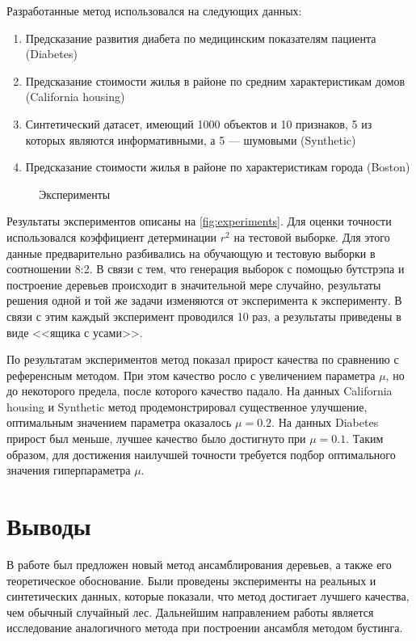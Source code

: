 \documentclass{article}
\begin{document}
Разработанные метод использовался на следующих данных:
\begin{enumerate}
  \item Предсказание развития диабета по медицинским показателям пациента (Diabetes)
  \item Предсказание стоимости жилья в районе по средним характеристикам домов (California housing)
  \item Синтетический датасет, имеющий 1000 объектов и 10 признаков, 5 из которых являются информативными, а 5 --- шумовыми (Synthetic)
  \item Предсказание стоимости жилья в районе по характеристикам города (Boston)
\end{enumerate}

\begin{figure}[h]
  \centering
  
  
  
  
  \caption{Эксперименты}
  \label{fig:experiments}
\end{figure}

Результаты экспериментов описаны на \autoref{fig:experiments}. Для оценки точности использовался коэффициент детерминации $r^2$ на тестовой выборке. Для этого данные предварительно разбивались на обучающую и тестовую выборки в соотношении 8:2. В связи с тем, что генерация выборок с помощью бутстрэпа и построение деревьев происходит в значительной мере случайно, результаты решения одной и той же задачи изменяются от эксперимента к эксперименту. В связи с этим каждый эксперимент проводился 10 раз, а результаты приведены в виде <<ящика с усами>>.

По результатам экспериментов метод показал прирост качества по сравнению с референсным методом. При этом качество росло с увеличением параметра $\mu$, но до некоторого предела, после которого качество падало. На данных California housing и Synthetic метод продемонстрировал существенное улучшение, оптимальным значением параметра оказалось $\mu=0.2$. На данных Diabetes прирост был меньше, лучшее качество было достигнуто при $\mu=0.1$. Таким образом, для достижения наилучшей точности требуется подбор оптимального значения гиперпараметра $\mu$. 

\section{Выводы}
В работе был предложен новый метод ансамблирования деревьев, а также его теоретическое обоснование. Были проведены эксперименты на реальных и синтетических данных, которые показали, что метод достигает лучшего качества, чем обычный случайный лес. Дальнейшим направлением работы является исследование аналогичного метода при построении ансамбля методом бустинга.
\end{document}

